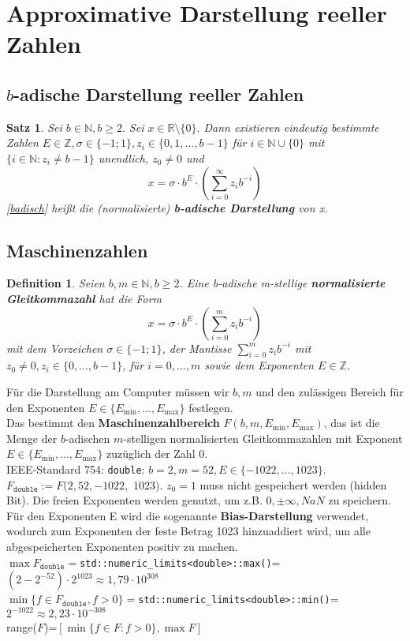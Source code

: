 \documentclass[12pt,a4paper]{article}
\theoremstyle{plain}
\newtheorem{Satz}[Theorem]{Satz}
\newtheorem{Definition}[Theorem]{Definition}
\newcommand{\herv}[1]{{\emph{\textbf{#1}}}}
\newcommand{\N}{\mathbb{N}}
\newcommand{\R}{\mathbb{R}}
\newcommand{\Z}{\mathbb{Z}}
\numberwithin{equation}{section}
\begin{document}
\section{Approximative Darstellung reeller Zahlen}
\subsection{$b$-adische Darstellung reeller Zahlen}
\begin{Satz} Sei $b\in \N, b\geq 2.$ Sei $x\in \R\setminus\{0\}.$ Dann existieren eindeutig bestimmte Zahlen $E\in \Z, \sigma \in \{-1;1\}, z_i\in \{0,1,\ldots,b-1\}$ für $i \in \N\cup\{0\}$ mit $\{i\in \N: z_i\neq b-1\}$ unendlich, $z_0\neq 0$ und
\begin{equation}
 x=\sigma \cdot b^E\cdot\left(\sum_{i=0}^{\infty}{z_ib^{-i}}\right) 
\end{equation}\label{badisch}
\eqref{badisch} heißt die (normalisierte) \herv{b-adische Darstellung} von x.
\end{Satz}
\subsection{Maschinenzahlen}
\begin{Definition}
Seien $b,m \in \N, b\geq 2$. Eine b-adische m-stellige \herv{normalisierte Gleitkommazahl} hat die Form \[
 x=\sigma \cdot b^E\cdot\left(\sum_{i=0}^{m}{z_ib^{-i}}\right) \]
mit dem Vorzeichen $\sigma\in \{-1;1\}$, der Mantisse $\sum_{i=0}^{m}{z_ib^{-i}}$ mit $z_0\neq 0, z_i\in\{0,\ldots,b-1\}$, für $i=0,\ldots,m$ sowie dem Exponenten $E \in \Z$.
\end{Definition}
Für die Darstellung am Computer müssen wir $b,m$ und den zulässigen Bereich für den Exponenten $E\in \{E_{\text{min}},\ldots,E_{\text{max}}\}$ festlegen.\\
Das bestimmt den \textbf{Maschinenzahlbereich} $F(b,m,E_{\text{min}},E_{\text{max}})$, das ist die Menge der $b$-adi\-schen $m$-stelligen normalisierten Gleitkommazahlen mit Exponent $E\in \{E_{\text{min}},\ldots,E_{\text{max}}\}$ zu\-züg\-lich der Zahl 0.\\
IEEE-Standard 754: \texttt{double}: $b=2, m=52, E\in\{-1022,\ldots,1023\}.$ $ F_{\mathtt{double}}:=F(2,52,-1022,$ $1023)$. $z_0=1$ muss nicht gespeichert werden (hidden Bit). Die freien Exponenten werden genutzt, um z.B. $0, \pm\infty , NaN$ zu speichern. Für den Exponenten E wird die sogenannte \textbf{Bias-Darstellung} verwendet, wodurch zum Exponenten der feste Betrag 1023 hinzuaddiert wird, um alle abgespeicherten Exponenten positiv zu machen.\\
$\max F_{\mathtt{double}}=$\texttt{std::numeric\_limits<double>::max()}=$(2-2^{-52})\cdot 2^{1023}\approx 1,79\cdot 10^{308}$\\
$\min \{ f\in F_{\mathtt{double}},f>0\}=$\texttt{std::numeric\_limits<double>::min()}=$2^{-1022}\approx 2,23\cdot 10^{-308}$\\
range($F$)=$\left[\min\{f\in F: f>0 \},\max F \right]$
\end{document}
